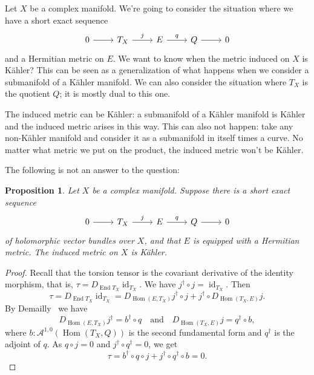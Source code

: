 \documentclass[10pt,a4paper]{article}
\newtheorem{prop}[theo]{Proposition}
\newtheorem*{proof}{Proof}
\newcommand{\cc}[1]{\mathcal{#1}}
\def\qandq{\quad\text{and}\quad}
\DeclareMathOperator{\End}{End}
\DeclareMathOperator{\Hom}{Hom}
\DeclareMathOperator{\id}{id}
\begin{document}
Let $X$ be a complex manifold. We're going to consider the situation where we have a short exact sequence
\[
\begin{tikzcd}
0 \arrow[r] & T_X \arrow[r,"j"] & E \arrow[r,"q"] & Q \arrow[r] & 0
\end{tikzcd}
\]
and a Hermitian metric on $E$. We want to know when the metric induced on $X$ is K\"ahler? This can be seen as a generalization of what happens when we consider a submanifold of a K\"ahler manifold. We can also consider the situation where $T_X$ is the quotient $Q$; it is mostly dual to this one.

The induced metric can be K\"ahler: a submanifold of a K\"ahler manifold is K\"ahler and the induced metric arises in this way. This can also not happen: take any non-K\"ahler manifold and consider it as a submanifold in itself times a curve. No matter what metric we put on the product, the induced metric won't be K\"ahler.

The following is not an answer to the question:



\begin{prop}
Let $X$ be a complex manifold. Suppose there is a short exact sequence
\[
\begin{tikzcd}
0 \arrow[r] & T_X \arrow[r,"j"] & E \arrow[r,"q"] & Q \arrow[r] & 0
\end{tikzcd}
\]
of holomorphic vector bundles over $X$, and that $E$ is equipped with a Hermitian metric. The induced metric on $X$ is K\"ahler.
\end{prop}

\begin{proof}
Recall that the torsion tensor is the covariant derivative of the identity morphism, that is, $\tau = D_{\End T_X} \id_{T_X}$.
We have $j^\dagger \circ j = \id_{T_X}$. Then
\[
\tau
= D_{\End T_X} \id_{T_X}
= D_{\Hom(E,T_X)}j^\dagger \circ j + j^\dagger \circ D_{\Hom(T_X,E)}j.
\]
By Demailly~\cite[Theorem~14.3]{demailly-complex} we have
\[
D_{\Hom(E,T_X)}j^\dagger
= b^\dagger \circ q
\qandq
D_{\Hom(T_X,E)}j
= q^\dagger \circ b,
\]
where $b : \cc A^{1,0}(\Hom(T_X,Q))$ is the second fundamental form and $q^\dagger$ is the adjoint of $q$.
As $q \circ j = 0$ and $j^\dagger \circ q^\dagger = 0$, we get
\[
\tau
= b^\dagger \circ q \circ j
+ j^\dagger \circ q^\dagger \circ b
= 0.
\]
\end{proof}
\end{document}
